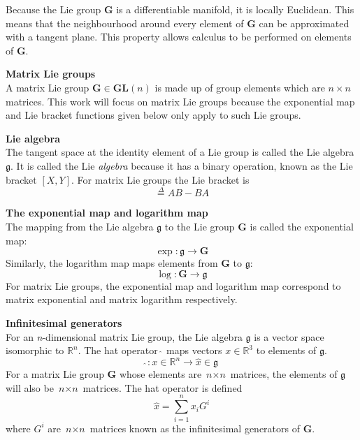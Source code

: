 		Because the Lie group $\mathbf{G}$ is a differentiable manifold, it is locally Euclidean. This means that the neighbourhood around every element of $\mathbf{G}$ can be approximated with a tangent plane. This property allows calculus to be performed on elements of $\mathbf{G}$.
		
		\textbf{Matrix Lie groups}\\
			A matrix Lie group $\mathbf{G} \in \mathbf{GL}(n)$ is made up of group elements which are $n \times n$ matrices.
			This work will focus on matrix Lie groups because the exponential map and Lie bracket functions given below only apply to such Lie groups.
		
		\textbf{Lie algebra}\\
			The tangent space at the identity element of a Lie group is called the Lie algebra $\mathfrak{g}$. It is called the Lie \textit{algebra} because it has a binary operation, known as the Lie bracket $[X,Y]$. For matrix Lie groups the Lie bracket is
			\begin{equation}
				[A,B] \stackrel{\Delta}{=} AB-BA
			\end{equation}
			
		\textbf{The exponential map and logarithm map}\\		
			The mapping from the Lie algebra $\mathfrak{g}$ to the Lie group $\mathbf{G}$ is called the exponential map:
			\begin{equation}
				\exp: \mathfrak{g} \rightarrow \mathbf{G}
			\end{equation}			
			Similarly, the logarithm map maps elements from $\mathbf{G}$ to $\mathfrak{g}$:
			\begin{equation}
				\log: \mathbf{G} \rightarrow \mathfrak{g}
			\end{equation}
			For matrix Lie groups, the exponential map and logarithm map correspond to matrix exponential and matrix logarithm respectively.
						
		\textbf{Infinitesimal generators}\\
			For an \textit{n}-dimensional matrix Lie group, the Lie algebra $\mathfrak{g}$ is a vector space isomorphic to $\mathbb{R}^n$. The hat operator $\hat{\:}$ maps vectors $x \in \mathbb{R}^3$ to elements of $\mathfrak{g}$.				
			\begin{equation}
				\hat{\:}: x \in \mathbb{R}^n \rightarrow \hat{x} \in \mathfrak{g}
			\end{equation}		
			For a matrix Lie group $\mathbf{G}$ whose elements are $\textit{n} \times \textit{n}$ matrices, the elements of $\mathfrak{g}$ will also be $\textit{n} \times \textit{n}$ matrices. The hat operator is defined
			\begin{equation}
				\hat{x} = \sum\limits_{i=1}^n x_iG^i 
			\end{equation}
			where $G^i$ are $\textit{n} \times \textit{n}$ matrices known as the infinitesimal generators of $\mathbf{G}$.
						
